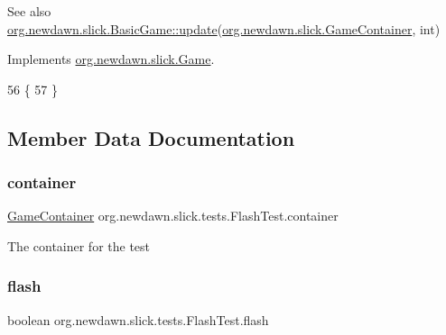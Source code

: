 \begin{DoxySeeAlso}{See also}
\mbox{\hyperlink{classorg_1_1newdawn_1_1slick_1_1_basic_game_acfe6fa05aef83bff1631af91a3e4bd20}{org.\+newdawn.\+slick.\+Basic\+Game\+::update}}(\mbox{\hyperlink{classorg_1_1newdawn_1_1slick_1_1_game_container}{org.\+newdawn.\+slick.\+Game\+Container}}, int) 
\end{DoxySeeAlso}


Implements \mbox{\hyperlink{interfaceorg_1_1newdawn_1_1slick_1_1_game_ab07b2e9463ee4631620dde0de25bdee8}{org.\+newdawn.\+slick.\+Game}}.


\begin{DoxyCode}
56                                                            \{
57     \}
\end{DoxyCode}


\subsection{Member Data Documentation}
\mbox{\label{classorg_1_1newdawn_1_1slick_1_1tests_1_1_flash_test_ad78e2796710293c14d8913b36a8e9e01}} 
\subsubsection{\texorpdfstring{container}{container}}
{\footnotesize\ttfamily \mbox{\hyperlink{classorg_1_1newdawn_1_1slick_1_1_game_container}{Game\+Container}} org.\+newdawn.\+slick.\+tests.\+Flash\+Test.\+container\hspace{0.3cm}{\ttfamily [private]}}

The container for the test \mbox{\label{classorg_1_1newdawn_1_1slick_1_1tests_1_1_flash_test_a190c127d700a8eb39c86d39f26b83d7f}} 
\subsubsection{\texorpdfstring{flash}{flash}}
{\footnotesize\ttfamily boolean org.\+newdawn.\+slick.\+tests.\+Flash\+Test.\+flash\hspace{0.3cm}{\ttfamily [private]}}

